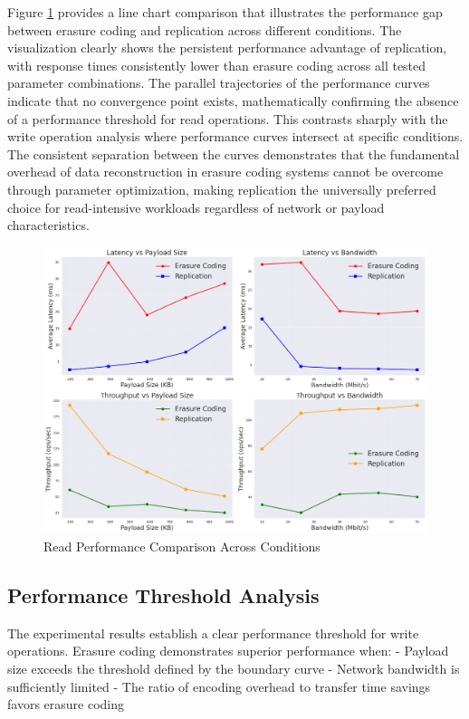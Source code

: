 Figure \ref{fig:read-line} provides a line chart comparison that illustrates the performance gap between erasure coding and replication across different conditions. The visualization clearly shows the persistent performance advantage of replication, with response times consistently lower than erasure coding across all tested parameter combinations. The parallel trajectories of the performance curves indicate that no convergence point exists, mathematically confirming the absence of a performance threshold for read operations. This contrasts sharply with the write operation analysis where performance curves intersect at specific conditions. The consistent separation between the curves demonstrates that the fundamental overhead of data reconstruction in erasure coding systems cannot be overcome through parameter optimization, making replication the universally preferred choice for read-intensive workloads regardless of network or payload characteristics.

\begin{figure}[ht]
\centering
\includegraphics[width=\columnwidth]{resources/chapter-4/read_bigload_avgnet_line.png}
\caption{Read Performance Comparison Across Conditions}
\label{fig:read-line}
\end{figure}

\subsection{Performance Threshold Analysis}

The experimental results establish a clear performance threshold for write operations. Erasure coding demonstrates superior performance when:
- Payload size exceeds the threshold defined by the boundary curve
- Network bandwidth is sufficiently limited
- The ratio of encoding overhead to transfer time savings favors erasure coding

